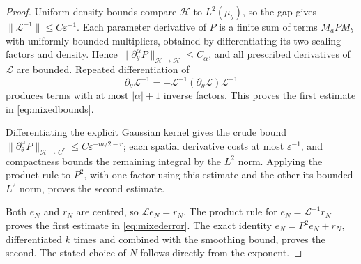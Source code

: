 \documentclass[11pt,a4paper]{article}
\theoremstyle{definition}\newtheorem{definition}[theorem]{Definition}
\theoremstyle{remark}\newtheorem{remark}[theorem]{Remark}
\newcommand{\eps}{\varepsilon}
\newcommand{\norm}[1]{\lVert #1\rVert}
\begin{document}
\begin{proof}
Uniform density bounds compare $\mathcal H$ to $L^2(\mu_\theta)$, so the gap gives $\norm{\mathcal L^{-1}}\leq C\eps^{-1}$. Each parameter derivative of $P$ is a finite sum of terms $M_aPM_b$ with uniformly bounded multipliers, obtained by differentiating its two scaling factors and density. Hence $\norm{\partial_\theta^\alpha P}_{\mathcal H\to\mathcal H}\leq C_\alpha$, and all prescribed derivatives of $\mathcal L$ are bounded. Repeated differentiation of
\[
\partial_\theta\mathcal L^{-1}
=-\mathcal L^{-1}(\partial_\theta\mathcal L)\mathcal L^{-1}
\]
produces terms with at most $|\alpha|+1$ inverse factors. This proves the first estimate in \eqref{eq:mixedbounds}.

Differentiating the explicit Gaussian kernel gives the crude bound
$\norm{\partial_\theta^\alpha P}_{\mathcal H\to C^r}\leq C\eps^{-m/2-r}$; each spatial derivative costs at most $\eps^{-1}$, and compactness bounds the remaining integral by the $L^2$ norm. Applying the product rule to $P^2$, with one factor using this estimate and the other its bounded $L^2$ norm, proves the second estimate.

Both $e_N$ and $r_N$ are centred, so $\mathcal L e_N=r_N$. The product rule for $e_N=\mathcal L^{-1}r_N$ proves the first estimate in \eqref{eq:mixederror}. The exact identity $e_N=P^2e_N+r_N$, differentiated $k$ times and combined with the smoothing bound, proves the second. The stated choice of $N$ follows directly from the exponent.
\end{proof}
\end{document}
